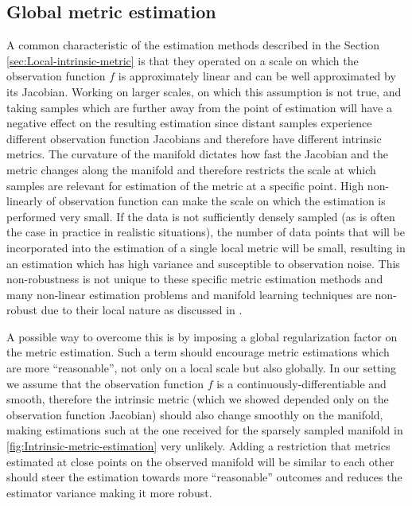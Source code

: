 	

	\subsection{Global metric estimation}
	\label{ssec:Global-metric-estimation}
	
	A common characteristic of the estimation methods described in the
	Section \cref{sec:Local-intrinsic-metric} is that they operated on
	a scale on which the observation function $f$ is approximately linear
	and can be well approximated by its Jacobian. Working on larger scales,
	on which this assumption is not true, and taking samples which are
	further away from the point of estimation will have a negative effect
	on the resulting estimation since distant samples experience different
	observation function Jacobians and therefore have different intrinsic
	metrics. The curvature of the manifold dictates how fast the Jacobian
	and the metric changes along the manifold and therefore restricts
	the scale at which samples are relevant for estimation of the metric
	at a specific point. High non-linearly of observation function can
	make the scale on which the estimation is performed very small. If
	the data is not sufficiently densely sampled (as is often the case
	in practice in realistic situations), the number of data points that
	will be incorporated into the estimation of a single local metric
	will be small, resulting in an estimation which has high variance
	and susceptible to observation noise. This non-robustness is not unique
	to these specific metric estimation methods and many non-linear estimation
	problems and manifold learning techniques are non-robust due to their
	local nature as discussed in \cite{bengio2004non}. 
	
	A possible way to overcome this is by imposing a global regularization
	factor on the metric estimation. Such a term should encourage metric
	estimations which are more ``reasonable'', not only on a local scale
	but also globally. In our setting we assume that the observation function
	$f$ is a continuously-differentiable and smooth, therefore the intrinsic
	metric (which we showed depended only on the observation function
	Jacobian) should also change smoothly on the manifold, making estimations
	such at the one received for the sparsely sampled manifold in \cref{fig:Intrinsic-metric-estimation} very unlikely. Adding a restriction
	that metrics estimated at close points on the observed manifold will
	be similar to each other should steer the estimation towards more
	``reasonable'' outcomes and reduces the estimator variance making
	it more robust.

